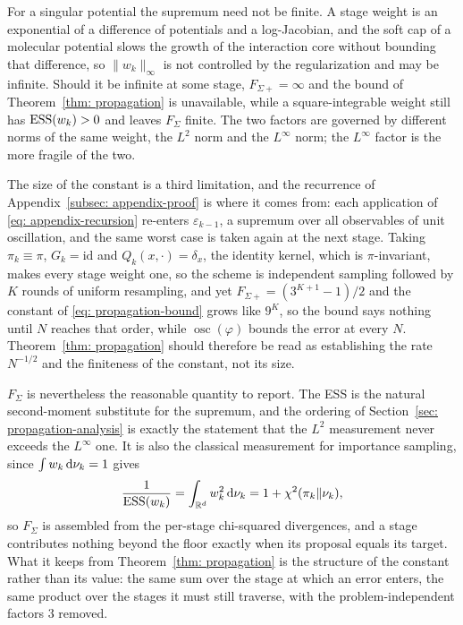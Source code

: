 \documentclass{article}
\begin{document}
For a singular potential the supremum need not be finite. A stage weight is an exponential of a difference of potentials and a log-Jacobian, and the soft cap of a molecular potential slows the growth of the interaction core without bounding that difference, so $\lVert w_k\rVert_\infty$ is not controlled by the regularization and may be infinite. Should it be infinite at some stage, $F_{\Sigma+}=\infty$ and the bound of Theorem~\ref{thm: propagation} is unavailable, while a square-integrable weight still has $\mathrm{ESS}(w_k)>0$ and leaves $F_\Sigma$ finite. The two factors are governed by different norms of the same weight, the $L^2$ norm and the $L^\infty$ norm; the $L^\infty$ factor is the more fragile of the two.

The size of the constant is a third limitation, and the recurrence of Appendix~\ref{subsec: appendix-proof} is where it comes from: each application of \eqref{eq: appendix-recursion} re-enters $\varepsilon_{k-1}$, a supremum over all observables of unit oscillation, and the same worst case is taken again at the next stage. Taking $\pi_k\equiv\pi$, $G_k=\mathrm{id}$ and $Q_k(x,\cdot)=\delta_x$, the identity kernel, which is $\pi$-invariant, makes every stage weight one, so the scheme is independent sampling followed by $K$ rounds of uniform resampling, and yet $F_{\Sigma+}=(3^{K+1}-1)/2$ and the constant of \eqref{eq: propagation-bound} grows like $9^{K}$, so the bound says nothing until $N$ reaches that order, while $\operatorname{osc}(\varphi)$ bounds the error at every $N$. Theorem~\ref{thm: propagation} should therefore be read as establishing the rate $N^{-1/2}$ and the finiteness of the constant, not its size.

$F_\Sigma$ is nevertheless the reasonable quantity to report. The ESS is the natural second-moment substitute for the supremum, and the ordering of Section~\ref{sec: propagation-analysis} is exactly the statement that the $L^2$ measurement never exceeds the $L^\infty$ one. It is also the classical measurement for importance sampling, since $\int w_k\,\mathrm{d}\nu_k=1$ gives
\begin{equation}
    \frac{1}{\mathrm{ESS}(w_k)} = \int_{\mathbb R^d} w_k^2\,\mathrm{d}\nu_k = 1 + \chi^2(\pi_k\|\nu_k) ,
    \label{eq: appendix-chisq}
\end{equation}
so $F_\Sigma$ is assembled from the per-stage chi-squared divergences, and a stage contributes nothing beyond the floor exactly when its proposal equals its target. What it keeps from Theorem~\ref{thm: propagation} is the structure of the constant rather than its value: the same sum over the stage at which an error enters, the same product over the stages it must still traverse, with the problem-independent factors $3$ removed.
\end{document}
